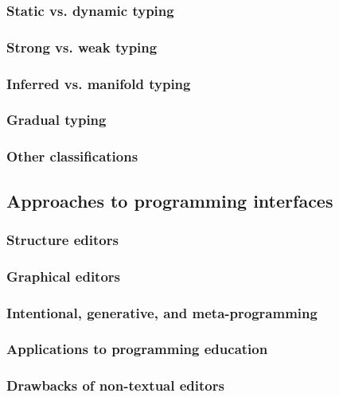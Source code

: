 \subsubsection{Static vs. dynamic typing}
\label{sec:staticness}

\subsubsection{Strong vs. weak typing}
\label{sec:strength}

\subsubsection{Inferred vs. manifold typing}
\label{sec:inferred_vs_manifold}

\subsubsection{Gradual typing}
\label{sec:gradual}

\subsubsection{Other classifications}
\label{sec:other_types}

\subsection{Approaches to programming interfaces}
\label{sec:prog_intf}

\subsubsection{Structure editors}
\label{sec:structure_editors}

\subsubsection{Graphical editors}
\label{sec:graphical_editors}

\subsubsection{Intentional, generative, and meta-programming}
\label{sec:intentional_programming}

\subsubsection{Applications to programming education}
\label{sec:programming_education}

\subsubsection{Drawbacks of non-textual editors}
\label{sec:textual_benefits}

